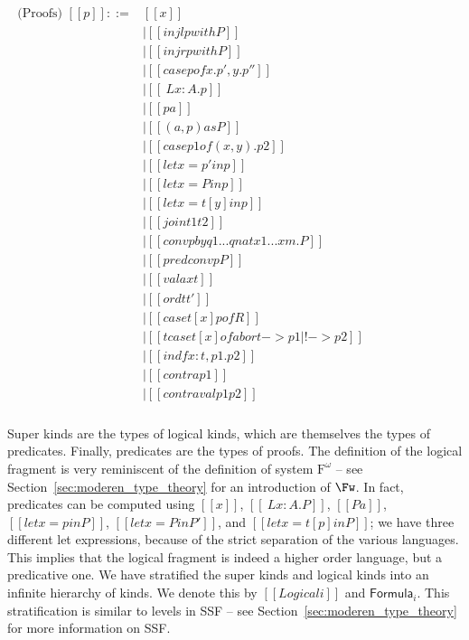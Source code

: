 \begin{center}
\begin{math}
\begin{array}{llllllllllllllll}
\begin{array}{lll}
        \text{(Proofs) } [[p]] ::= 
        & [[x]] \\
        & \mid [[injl p with P]] \\
        & \mid [[injr p with P]] \\
        & \mid [[case p of x . p' , y . p'']] \\
        & \mid [[\ L x : A . p]] \\
        & \mid [[p a]] \\ 
        & \mid [[(a , p ) as P]] \\
        & \mid [[case p1 of ( x , y ) . p2]] \\
        & \mid [[let x = p' in p]] \\
        & \mid [[let x = P in p]] \\
        & \mid [[let x = t [ y ] in p]] \\
        & \mid [[join t1 t2]] \\
        & \mid [[conv p by q1 ... qn at x1 ... xm . P]] \\
        & \mid [[predconv p P]] \\
        & \mid [[valax t]] \\
        & \mid [[ord t t']] \\
        & \mid [[case t [ x ] p of R]] \\
        & \mid [[tcase t [ x ] of abort -> p1 | ! -> p2]] \\
        & \mid [[ind f x : t , p1 . p2]] \\
        & \mid [[contra p1]] \\
        & \mid [[contraval p1 p2]]\\
      \end{array}
    \end{array}
  \end{math}
\end{center}
Super kinds are the types of logical kinds, which are themselves the
types of predicates.  Finally, predicates are the types of proofs.
The definition of the logical fragment is very reminiscent of the
definition of system $\text{F}^\omega$ -- see
Section~\ref{sec:moderen_type_theory} for an introduction of $\Fw$.
In fact, predicates can be computed using $[[x]]$, $[[\ L x : A
. P]]$, $[[P a]]$, $[[let x = p in P]]$, $[[let x = P in P']]$, and
$[[let x = t [ p ] in P]]$; we have three different let expressions,
because of the strict separation of the various languages.  This
implies that the logical fragment is indeed a higher order language,
but a predicative one.  We have stratified the super kinds and logical
kinds into an infinite hierarchy of kinds.  We denote this by
$[[Logical i]]$ and $\mathsf{Formula}_{i}$.  This stratification is similar
to levels in SSF -- see Section~\ref{sec:moderen_type_theory} for more
information on SSF.  

